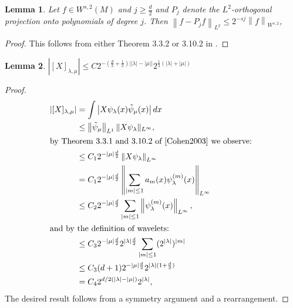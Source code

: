 \documentclass[12pt]{amsart}
\newcommand{\abs}[1]{\left| #1 \right|}
\newcommand{\norm}[1]{\left\| #1 \right\|}
\newcommand{\card}[1]{\left| #1 \right|}
\newtheorem{lem}{Lemma}
\begin{document}
\begin{lem} \label{lem:projection_bound}
	Let $f \in W^{s,2}(M)$ and $j \geq \frac{d}{2}$ and $P_j$ denote the $L^2$-orthogonal projection onto polynomials of degree $j$.
	Then $\norm{f - P_j f}_{L^2} \leq  2^{-sj}\norm{f}_{W^{s,2}}$,
\end{lem}
\begin{proof}
	This follows from either Theorem 3.3.2 or 3.10.2 in \cite{Cohen2003}.
\end{proof}

\begin{lem} \label{lem:matrix_bound}
	$\abs{[X]_{\lambda,\mu}} \leq C 2^{-(\frac{d}{2}+\frac{1}{2})\abs{\abs{\lambda}-\abs{\mu}}}2^{\frac{1}{2}(\abs{\lambda}+\abs{\mu})}$
\end{lem}
\begin{proof}
	\begin{align*}
		\abs{[X]_{\lambda,\mu}} 	&= \int \abs{X \psi_{\lambda}(x) \tilde{\psi}_{\mu}(x)} dx \\
								&\leq \norm{\tilde{\psi}_\mu}_{L^1} \| X \psi_\lambda \|_{L^\infty}, \\ %
							\intertext{by Theorem 3.3.1 and 3.10.2 of \cite{Cohen2003} we observe: }
								&\leq C_1 2^{-\card{\mu}\frac{d}{2}}\norm{X\psi_{\lambda}}_{L^{\infty}} \\
								&= C_1 2^{-\card{\mu}\frac{d}{2}}\norm{ \sum_{\abs{m} \leq 1 } a_m(x) \psi^{(m)}_\lambda(x) }_{L^{\infty}} \\
								&\leq C_2 2^{-\card{\mu}\frac{d}{2}}\sum_{\card{m}\leq 1}\norm{\psi_{\lambda}^{(m)}(x)}_{L^{\infty}} , \\
							\intertext{and by the definition of wavelets:}
								&\leq C_3 2^{-\card{\mu}\frac{d}{2}} 2^{\card{\lambda}\frac{d}{2}} \sum_{\card{m}\leq 1} (2^{\card{\lambda}})^{\abs{m}} \\
								&\leq C_3 (d+1) 2^{-\card{\mu}\frac{d}{2}} 2^{\card{\lambda}(1+\frac{d}{2})} \\
								&= C_4 2^{d/2(\card{\lambda} - \card{\mu})}2^{\card{\lambda}},
	\end{align*}
	The desired result follows from a symmetry argument and a rearrangement.
\end{proof}
\end{document}
